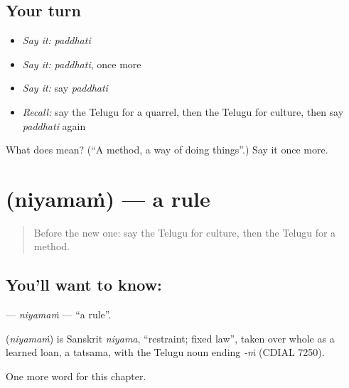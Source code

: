 \subsection*{Your turn}
\begin{itemize}
\raggedright
  \item \emph{Say it:} \emph{paddhati}
  \item \emph{Say it:} \emph{paddhati}, once more
  \item \emph{Say it:} say \emph{paddhati}
  \item \emph{Recall:} say the Telugu for a quarrel, then the Telugu for culture, then say \emph{paddhati} again
\end{itemize}

\begin{tcolorbox}[breakable,colback=teal!4,colframe=teal!35!black,title={Before you move on}]
What does  mean? (\textquotedblleft{}A method, a way of doing things\textquotedblright{}.) Say it once more.
\end{tcolorbox}
\section[\texorpdfstring{\te{నియమం} (niyamaṁ)}{నియమం (niyamaṁ)}]{ (niyamaṁ) — a rule}

\label{lesson:TE-C258-niyamam}



\begin{quote}
Before the new one: say the Telugu for culture, then the Telugu for a method.
\end{quote}

\subsection*{You'll want to know: }
\textbf{} — \emph{niyamaṁ} — \textquotedblleft{}a rule\textquotedblright{}.

\begin{cousinweb}
\textbf{} (\emph{niyamaṁ}) is Sanskrit \emph{niyama}, \textquotedblleft{}restraint; fixed law\textquotedblright{}, taken over whole as a learned loan, a tatsama, with the Telugu noun ending \emph{-ṁ} (CDIAL 7250).
\end{cousinweb}

\begin{grammarlens}[title={What you've built}]
One more word for this chapter.
\end{grammarlens}

